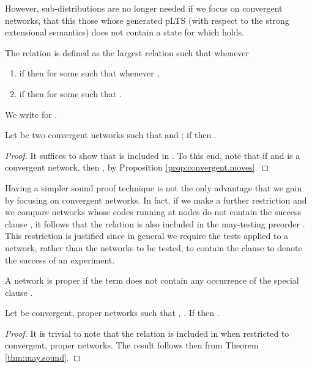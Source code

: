 \documentclass{LMCS}
\begin{document}
However, sub-distributions are no longer needed if we 
focus on convergent networks, that this those whose 
generated pLTS (with respect to the strong extensional semantics) 
does not contain a state  for which  
holds. 

\begin{defi}
\label{def:dfdeadsim}
The relation  is defined 
as the largest relation such that whenever 

\begin{enumerate}[label=(\roman*)]
\item if  then  
for some  such that  whenever 
,
\item if  then 
 for some  
such that .
\end{enumerate}
\end{defi}

\noindent We write  for . 

\begin{thm}
\label{thm:must.dfsound}
Let  be two convergent 
networks such that  
and ; if  then 
.
\end{thm}

\begin{proof}
It suffices to show that  is included in 
. To this end, note that if 
 and  is a convergent 
network, then , by Proposition 
\ref{prop:convergent.moves}.
\end{proof}

Having a simpler sound proof technique is not the only 
advantage that we gain by focusing on convergent networks. 
In fact, if we make a further restriction and we compare networks 
whose codes running at nodes do not contain the success clause 
, it follows that the relation  is also included 
in the may-testing preorder . This restriction is justified 
since in general we require the tests applied to a network, 
rather than the networks to be tested, to contain the clause 
 to denote the success of an experiment. 

\begin{thm}
\label{thm:may.dfsound}
A network  is proper if the term  does not 
contain any occurrence of the special clause . 

Let  be convergent, proper networks such that 
, . 
If  
then .
\end{thm}

\begin{proof}
It is trivial to note that the relation  is included in 
 when restricted to convergent, proper networks. 
The result follows then from Theorem \ref{thm:may.sound}.
\end{proof}
\end{document}
